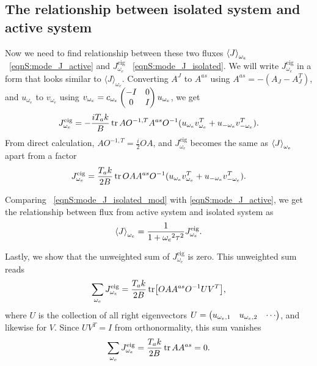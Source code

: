 \documentclass[
 amsmath,amssymb,
 aps,
 pre,
 longbibliography,
 10pt, onecolumn,
 notitlepage
]{revtex4-1}
\begin{document}
\subsection{The relationship between isolated system and active system}
Now we need to find relationship between these two fluxes $\expval{J}_{\omega_e}$ \eqnname~\eqref{eqnS:mode_J_active} and $J_{\omega_e}^\text{eig}$ \eqnname~\eqref{eqnS:mode_J_isolated}. 
We will write $J_{\omega_e}^\text{eig}$ in a form that looks similar to
$\langle J\rangle_{\omega_e}$.
Converting $A^{J}$ to $A^{as}$ using $A^{as}=-(A_J-A_J^T)$, and $u_{\omega_e}$ to $v_{\omega_e}$ using $v_{\omega_e} = c_{\omega_e} \pmqty{ -I & 0 \\ 0 & I } u_{\omega_e}$, we get
\begin{equation}
J_{\omega_e}^\text{eig} = -\frac{iT_ak}{B} \tr AO^{-1,T}A^{as}O^{-1} (u_{\omega_e} v_{\omega_e}^T + u_{-{\omega_e}}v_{-{\omega_e}}^T) .
\end{equation}
From direct calculation, $AO^{-1,T} = \frac{i}{2} OA$, and $J_{\omega_e}^\text{eig}$ becomes the same as $\expval{J}_{\omega_e}$ apart from a factor
\begin{equation} \label{eqnS:mode_J_isolated_mod}
J_{\omega_e}^\text{eig} = \frac{T_ak}{2B} \tr OAA^{as}O^{-1} (u_{\omega_e} v_{\omega_e}^T + u_{-{\omega_e}}v_{-{\omega_e}}^T) .
\end{equation}

Comparing \eqnname~\eqref{eqnS:mode_J_isolated_mod} with \eqref{eqnS:mode_J_active}, we get the relationship between flux from active system and isolated system as
\begin{equation} \label{eqnS:mode_J_relation}
\expval{J}_{\omega_e} = \frac{1}{1 + {\omega_e}^2 \tau^2} J_{\omega_e}^\text{eig} .
\end{equation}

Lastly, we show that the unweighted sum of $J_{\omega_e}^\text{eig}$ is zero.
This unweighted sum reads
\begin{equation}
\sum_{\omega_e} J_{\omega_e}^\text{eig} = \frac{T_ak}{2B} \tr [O A A^{as} O^{-1} UV^T],
\end{equation}
where $U$ is the collection of all right eigenvectors $U = \pmqty{u_{\omega_e,1} & u_{\omega_e,2} & \cdots}$, and likewise for $V$.
Since $UV^T = I$ from orthonormality, this sum vanishes
\begin{equation} \label{eqnS:mode_J_sum}
\sum_{\omega_e} J_{\omega_e}^\text{eig} = \frac{T_ak}{2B} \tr A A^{as} = 0.
\end{equation}
\end{document}
